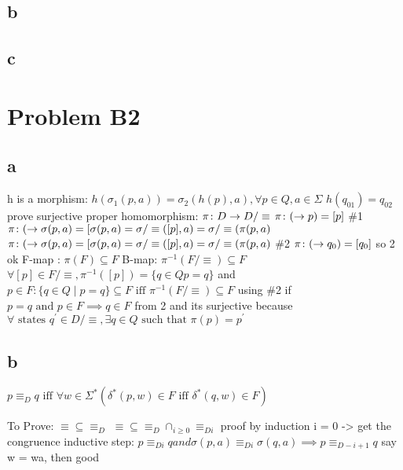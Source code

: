 \documentclass[12pt]{article}
\begin{document}
\subsection*{b}

\subsection*{c}

\section*{Problem B2}
\subsection*{a}
h is a morphism:
$h(\sigma_1(p,a)) = \sigma_2(h(p),a), \forall p \in Q, a \in \Sigma$
$h(q_01) = q_02$
prove surjective proper homomorphism:
$\pi\colon D\rightarrow D/\equiv$ \newline
$\pi\colon (\rightarrow p) = [p]$ \newline
\#1 $\pi\colon (\rightarrow \sigma(p, a) = [\sigma(p,a) = \sigma/\equiv([p], a) = \sigma / \equiv({\pi}(p,a)$ \newline
$\pi\colon (\rightarrow \sigma(p, a) = [\sigma(p,a) = \sigma/\equiv([p], a) = \sigma / \equiv({\pi}(p,a)$ \newline
\#2 $\pi\colon (\rightarrow q_0) = [q_0]$ so 2 ok \newline
F-map : ${\pi}(F) \subseteq F$ \newline
B-map: ${\pi}^{-1}(F/\equiv) \subseteq F$ \newline
$\forall [p] \in F/\equiv, {\pi}^{-1}([p]) =\{ q \in Q p = q\}$ \newline
and $p \in F : \{q \in Q \mid p = q\} \subseteq F \text{ iff } {\pi}^{-1}(F/\equiv) \subseteq F$ using \#2 \newline
if $p=q \text{ and } p\in F \implies q \in F$ from 2 \newline
and its surjective because $\forall \text{ states } q^{'} \in D/\equiv , \exists q \in Q \text{ such that } {\pi}(p) = p^{'}$ \newline

\subsection*{b}
$p \equiv_D q \text{ iff } \forall w \in \Sigma^{*} (\delta^{*}(p,w) \in F \text{ iff } \delta^{*}(q,w) \in F)$

To Prove: $ \equiv \subseteq \equiv_D$
$ \equiv \subseteq \equiv_D \cap_{i \ge 0} \equiv_{Di}$
proof by induction
i = 0 -> get the congruence
inductive step:
$p \equiv_{Di} q and \sigma(p,a) \equiv_{Di} \sigma(q,a) \implies p \equiv_{D-{i+1}} q$
say w = wa, then good
\end{document}

